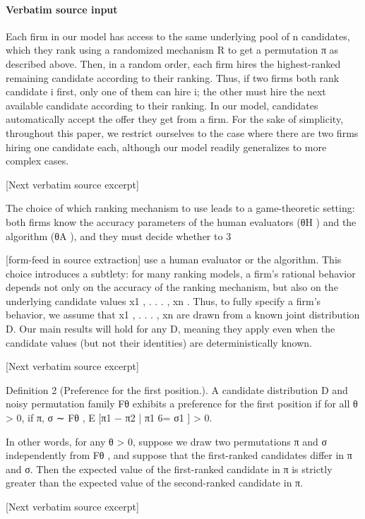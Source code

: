 \documentclass[10pt]{article}
\begin{document}
\paragraph{Verbatim source input}
\begin{ReviewVerbatim}
Each firm in our model has access to the same underlying pool of n candidates, which they rank using
a randomized mechanism R to get a permutation π as described above. Then, in a random order, each
firm hires the highest-ranked remaining candidate according to their ranking. Thus, if two firms both rank
candidate i first, only one of them can hire i; the other must hire the next available candidate according to
their ranking. In our model, candidates automatically accept the offer they get from a firm. For the sake
of simplicity, throughout this paper, we restrict ourselves to the case where there are two firms hiring one
candidate each, although our model readily generalizes to more complex cases.

[Next verbatim source excerpt]

The choice of which ranking mechanism to use leads to a game-theoretic setting: both firms know the
accuracy parameters of the human evaluators (θH ) and the algorithm (θA ), and they must decide whether to
3


[form-feed in source extraction]
use a human evaluator or the algorithm. This choice introduces a subtlety: for many ranking models, a firm’s
rational behavior depends not only on the accuracy of the ranking mechanism, but also on the underlying
candidate values x1 , . . . , xn . Thus, to fully specify a firm’s behavior, we assume that x1 , . . . , xn are drawn
from a known joint distribution D. Our main results will hold for any D, meaning they apply even when the
candidate values (but not their identities) are deterministically known.

[Next verbatim source excerpt]

Definition 2 (Preference for the first position.). A candidate distribution D and noisy permutation family
Fθ exhibits a preference for the first position if for all θ > 0, if π, σ ∼ Fθ ,
E [π1 − π2 | π1 6= σ1 ] > 0.

In other words, for any θ > 0, suppose we draw two permutations π and σ independently from Fθ , and
suppose that the first-ranked candidates differ in π and σ. Then the expected value of the first-ranked
candidate in π is strictly greater than the expected value of the second-ranked candidate in π.

[Next verbatim source excerpt]


\end{ReviewVerbatim}
\end{document}
